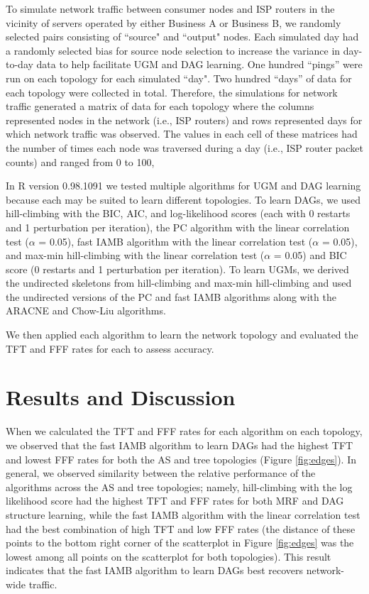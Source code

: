 \documentclass[conference]{IEEEtran}
\begin{document}
To simulate network traffic between consumer nodes and ISP routers in the vicinity of servers operated by either Business A or Business B, we randomly selected pairs consisting of ``source" and ``output" nodes. Each simulated day had a randomly selected bias for source node selection to increase the variance in day-to-day data to help facilitate UGM and DAG learning. One hundred ``pings” were run on each topology for each simulated ``day". Two hundred ``days” of data for each topology were collected in total. Therefore, the simulations for network traffic generated a matrix of data for each topology where the columns represented nodes in the network (i.e., ISP routers) and rows represented days for which network traffic was observed. The values in each cell of these matrices had the number of times each node was traversed during a day (i.e., ISP router packet counts) and ranged from 0 to 100,

In R version 0.98.1091 \cite{b18} we tested multiple algorithms \cite{b10} for UGM and DAG learning because each may be suited to learn different topologies. To learn DAGs, we used hill-climbing with the BIC, AIC, and log-likelihood scores (each with 0 restarts and 1 perturbation per iteration), the PC algorithm with the linear correlation test ($\alpha$ = 0.05), fast IAMB algorithm with the linear correlation test ($\alpha$ = 0.05), and max-min hill-climbing with the linear correlation test ($\alpha$ = 0.05) and BIC score (0 restarts and 1 perturbation per iteration). To learn UGMs, we derived the undirected skeletons from hill-climbing and max-min hill-climbing and used the undirected versions of the PC and fast IAMB algorithms along with the ARACNE and Chow-Liu algorithms.

We then applied each algorithm to learn the network topology and evaluated the TFT and FFF rates for each to assess accuracy.

\section{Results and Discussion}

When we calculated the TFT and FFF rates for each algorithm on each topology, we observed that the fast IAMB algorithm to learn DAGs had the highest TFT and lowest FFF rates for both the AS and tree topologies (Figure \ref{fig:edges}). In general, we observed similarity between the relative performance of the algorithms across the AS and tree topologies; namely, hill-climbing with the log likelihood score had the highest TFT and FFF rates for both MRF and DAG structure learning, while the fast IAMB algorithm with the linear correlation test had the best combination of high TFT and low FFF rates (the distance of these points to the bottom right corner of the scatterplot in Figure \ref{fig:edges} was the lowest among all points on the scatterplot for both topologies). This result indicates that the fast IAMB algorithm to learn DAGs best recovers network-wide traffic. 
\end{document}
